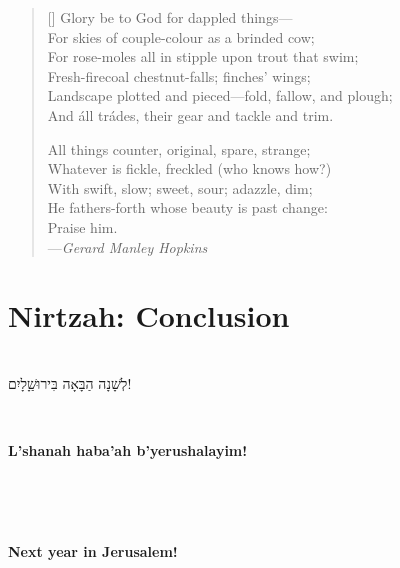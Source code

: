 \documentclass[a4paper,12pt,openany]{memoir}
\newcommand{\HgInst}[1]{{\noindent\sffamily{\bfseries{#1}}}}
\newcommand{\HgSource}[1]{\hfill{\small---\itshape{#1}}}
\newcommand{\HgHL}[1]{{\Large\textbf{#1}\par\noindent\\[-.5em]}}
\newcommand{\HgFill}{\vfill \hrule \vfill}
\newenvironment{HgEnglish}{\strut\\\noindent}{\vspace{1em}}
\newenvironment{HgTranslit}{\strut\\\noindent\begin{itshape}}{\end{itshape}\vspace{1em}}
\newenvironment{HgHebrew}{\begin{hebrew}\strut\\\noindent\Large}{\end{hebrew}}
\begin{document}
\vspace{-2em}
\settowidth{\versewidth}{Landscape plotted and pieced---fold, fallow and plough;}
\begin{verse}[\versewidth]
Glory be to God for dappled things--- \\
\vin  For skies of couple-colour as a brinded cow; \\
\vin \vin    For rose-moles all in stipple upon trout that swim; \\
Fresh-firecoal chestnut-falls; finches’ wings; \\
\vin  Landscape plotted and pieced---fold, fallow, and plough; \\
\vin \vin    And \'{a}ll tr\'{a}des, their gear and tackle and trim. 
 
All things counter, original, spare, strange; \\
\vin  Whatever is fickle, freckled (who knows how?) \\
\vin \vin    With swift, slow; sweet, sour; adazzle, dim; \\
He fathers-forth whose beauty is past change: \\
\vin \vin \vin                  Praise him.\\
\HgSource{Gerard Manley Hopkins}
\end{verse}

\chapter*{Nirtzah: Conclusion}

\vfill

\begin{HgHebrew}
  לְשָׁנָה הַבָּאָה בִּירוּשַָׁלָיִם!
  \vspace{-1em}
\end{HgHebrew}

\begin{HgTranslit}
  \HgHL{L'shanah haba'ah b'yerushalayim!}
  \vspace{-3em}
\end{HgTranslit}

\begin{HgEnglish}
  \HgHL{Next year in Jerusalem!}
\end{HgEnglish}

\HgInst{Sing!}
\end{document}
